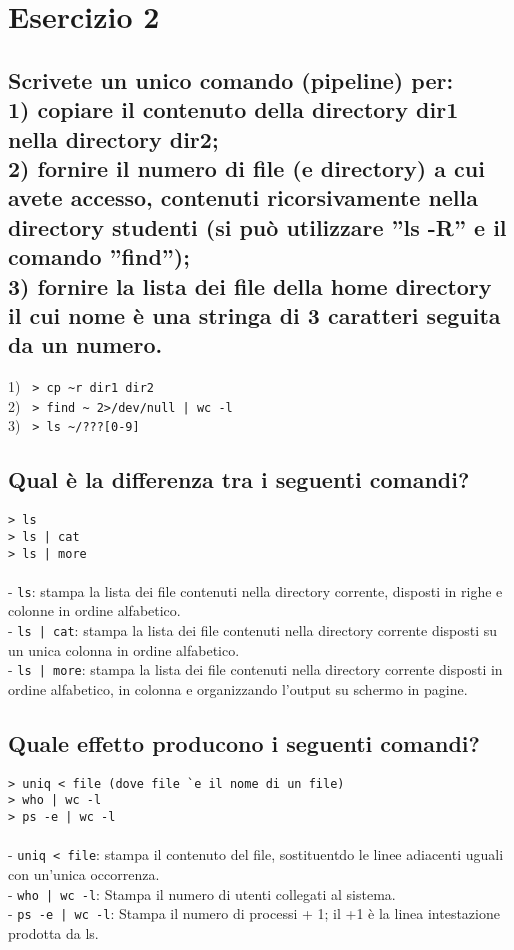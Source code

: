 \section{Esercizio 2}

\subsection{Scrivete un unico comando (pipeline) per: \\
1) copiare il contenuto della directory dir1 nella directory dir2; \\
2) fornire il numero di file (e directory) a cui avete accesso, contenuti
ricorsivamente nella directory studenti (si pu\`o utilizzare ''ls -R'' e il
comando ''find''); \\
3) fornire la lista dei file della home directory il cui nome \`e una stringa di
 3 caratteri seguita da un numero.}
1) \verb: > cp ~r dir1 dir2: \\
2) \verb: > find ~ 2>/dev/null | wc -l: \\
3) \verb: > ls ~/???[0-9]: \\


\subsection{Qual \`e la differenza tra i seguenti comandi?}
\verb:> ls:	\\
\verb:> ls | cat:	\\
\verb:> ls | more:	\\
\\
- \verb:ls:: stampa la lista dei file contenuti nella directory corrente,
disposti in righe e colonne in ordine alfabetico. \\
- \verb:ls | cat:: stampa la lista dei file contenuti nella directory
corrente disposti su un unica colonna in ordine alfabetico. \\
- \verb:ls | more:: stampa la lista dei file contenuti nella directory
corrente disposti in ordine alfabetico, in colonna e organizzando l'output su
schermo in pagine. \\


\subsection{Quale effetto producono i seguenti comandi?}
\verb:> uniq < file (dove file `e il nome di un file): \\
\verb:> who | wc -l:	\\
\verb:> ps -e | wc -l:	\\
\\
- \verb:uniq < file:: stampa il contenuto del file, sostituentdo le
linee adiacenti uguali con un'unica occorrenza. \\
- \verb:who | wc -l:: Stampa il numero di utenti collegati al
sistema. \\
- \verb:ps -e | wc -l:: Stampa il numero di processi + 1; il +1 è la
linea intestazione prodotta da ls. \\



